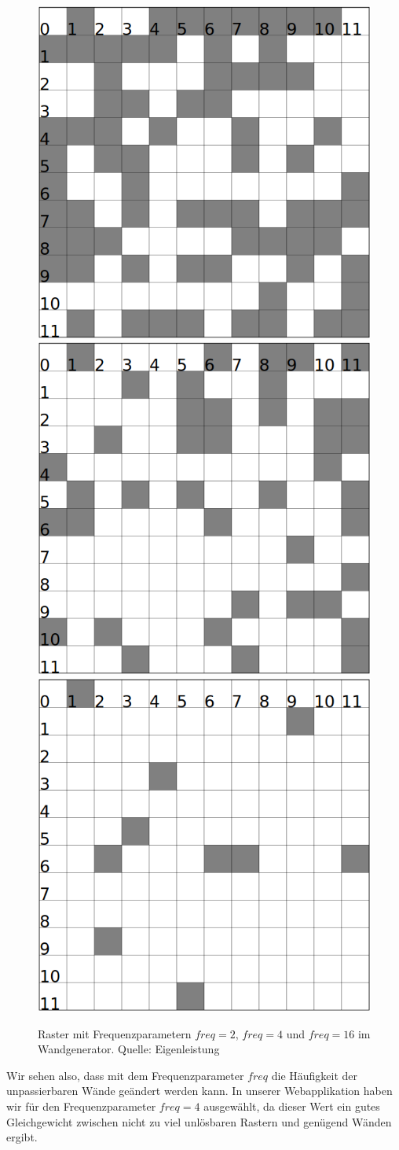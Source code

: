 \documentclass[12pt,a4paper,german]{report}
\begin{document}
\begin{figure}[H]
  \centering
  \includegraphics[width=.3\linewidth]{freq_for_2}
  \quad
  \includegraphics[width=.3\linewidth]{freq_for_4}
  \quad
  \includegraphics[width=.3\linewidth]{freq_for_16}\\
  \caption[Raster mit Frequenzparametern $freq = 2$, $freq = 4$ und $freq = 16$ im Wandgenerator.]{Raster mit Frequenzparametern $freq = 2$, $freq = 4$ und $freq = 16$ im Wandgenerator. Quelle: Eigenleistung}
  \label{fig:freq_param}
\end{figure}
Wir sehen also, dass mit dem Frequenzparameter $freq$ die Häufigkeit der unpassierbaren Wände geändert werden kann. In unserer Webapplikation haben wir für den Frequenzparameter $freq = 4$ ausgewählt, da dieser Wert ein gutes Gleichgewicht zwischen nicht zu viel unlösbaren Rastern und genügend Wänden ergibt.
\end{document}
